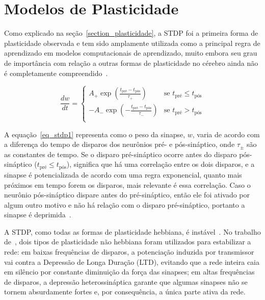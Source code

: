 \section{Modelos de Plasticidade}

Como explicado na seção~\ref{section_plasticidade}, a STDP foi a primeira forma de plasticidade observada e tem sido amplamente
utilizada como a principal regra de aprendizado em modelos computacionais de aprendizado, muito embora seu grau de importância com
relação a outras formas de plasticidade no cérebro ainda não é completamente compreendido~\cite{feldmanSpike2020}.

\begin{equation}
\label{eq_stdp1}
\frac{dw}{dt} = 
\begin{cases}
      A_{+} \exp(\frac{t_{\text{pré}} - t_{\text{pós}}}{\tau_{+}}) & \text{se $t_{\text{pré}} \le t_{\text{pós}}$}\\
      -A_{-} \exp(-\frac{t_{\text{pré}} - t_{\text{pós}}}{\tau_{-}}) & \text{se $t_{\text{pré}} > t_{\text{pós}}$}\\
\end{cases}
\end{equation}

A equação~\ref{eq_stdp1} representa como o peso da sinapse, $w$, varia de acordo com a diferença do tempo de disparos dos
neurônios pré- e pós-sináptico, onde $\tau_{\pm}$ são as constantes de tempo. Se o disparo pré-sináptico ocorre antes do disparo
pós-sináptico ($t_{\text{pré}} \le t_{\text{pós}}$), significa que há uma correlação entre os dois disparos, e a sinapse é potencializada de
acordo com uma regra exponencial, quanto mais próximos em tempo forem os disparos, mais relevante é essa correlação. Caso o
neurônio pós-sináptico dispare antes do pré-sináptico, então ele foi ativado por algum outro motivo e não há relação com o disparo
pré-sináptico, portanto a sinapse é deprimida~\cite{yamazakiSpiking2022}.

A STDP, como todas as formas de plasticidade hebbiana, é instável~\cite{gerstnerSpiking2002}. No trabalho
de~\cite{zenkeDiverse2015}, dois tipos de plasticidade não hebbiana foram utilizados para estabilizar a rede: em baixas
frequências de disparos, a potenciação induzida por transmissor vai contra a Depressão de Longa Duração (LTD), evitando que a rede
inteira caia em silêncio por constante diminuição da força das sinapses; em altas frequências de disparos, a depressão
heterossináptica garante que algumas sinapses não se tornem absurdamente fortes e, por consequência, a única parte ativa da rede.

